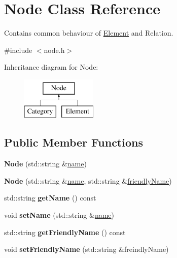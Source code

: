 \hypertarget{class_node}{\section{\-Node \-Class \-Reference}
\label{class_node}
}


\-Contains common behaviour of \hyperlink{class_element}{\-Element} and \-Relation.  




{\ttfamily \#include $<$node.\-h$>$}

\-Inheritance diagram for \-Node\-:\begin{figure}[H]
\begin{center}
\leavevmode
\includegraphics[height=2.000000cm]{class_node}
\end{center}
\end{figure}
\subsection*{\-Public \-Member \-Functions}
\begin{DoxyCompactItemize}
\item 
\hypertarget{class_node_a7361638565b7576b0913cdab4a9d76ed}{{\bfseries \-Node} (std\-::string \&\hyperlink{class_node_aa829edc37a2c92dacdab95bcef248175}{name})}\label{class_node_a7361638565b7576b0913cdab4a9d76ed}

\item 
\hypertarget{class_node_a9b0e76d1e080fef19fd6d5594164b7a2}{{\bfseries \-Node} (std\-::string \&\hyperlink{class_node_aa829edc37a2c92dacdab95bcef248175}{name}, std\-::string \&\hyperlink{class_node_a157acddebd6860eccdc8495039db161f}{friendly\-Name})}\label{class_node_a9b0e76d1e080fef19fd6d5594164b7a2}

\item 
\hypertarget{class_node_ac0e1bf66136011341971a9bd96dbb77a}{std\-::string {\bfseries get\-Name} () const }\label{class_node_ac0e1bf66136011341971a9bd96dbb77a}

\item 
\hypertarget{class_node_a8bc03b0b4b85cc0bf899a1bb20ec3a6f}{void {\bfseries set\-Name} (std\-::string \&\hyperlink{class_node_aa829edc37a2c92dacdab95bcef248175}{name})}\label{class_node_a8bc03b0b4b85cc0bf899a1bb20ec3a6f}

\item 
\hypertarget{class_node_a0e9e65379a0b636ebcb6a85c42eceea5}{std\-::string {\bfseries get\-Friendly\-Name} () const }\label{class_node_a0e9e65379a0b636ebcb6a85c42eceea5}

\item 
\hypertarget{class_node_afd3914fd125d95c3eb5749570dd01fba}{void {\bfseries set\-Friendly\-Name} (std\-::string \&freindly\-Name)}\label{class_node_afd3914fd125d95c3eb5749570dd01fba}

\end{DoxyCompactItemize}
